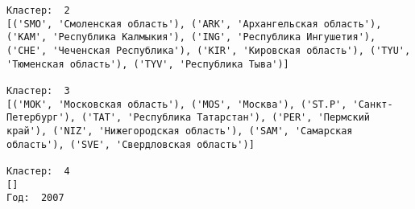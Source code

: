 \documentclass[11pt]{article}
\begin{document}
\begin{Verbatim}[commandchars=\\\{\}]
Кластер:  2
[('SMO', 'Смоленская область'), ('ARK', 'Архангельская область'), ('KAM', 'Республика Калмыкия'), ('ING', 'Республика Ингушетия'), ('CHE', 'Чеченская Республика'), ('KIR', 'Кировская область'), ('TYU', 'Тюменская область'), ('TYV', 'Республика Тыва')]

Кластер:  3
[('MOK', 'Московская область'), ('MOS', 'Москва'), ('ST.P', 'Санкт-Петербург'), ('TAT', 'Республика Татарстан'), ('PER', 'Пермский край'), ('NIZ', 'Нижегородская область'), ('SAM', 'Самарская область'), ('SVE', 'Свердловская область')]

Кластер:  4
[]
Год:  2007

    \end{Verbatim}

    \begin{center}
    \end{center}
    { \hspace*{\fill} \\}
    
\end{document}
